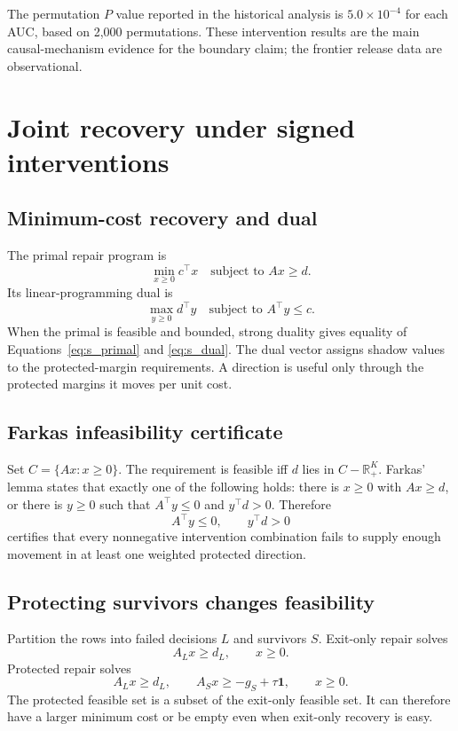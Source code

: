 \documentclass[11pt,letterpaper]{article}
\theoremstyle{plain}
\newcommand{\R}{\mathbb R}
\newcommand{\1}{\mathbf 1}
\begin{document}
The permutation $P$ value reported in the historical analysis is $5.0\times10^{-4}$ for each AUC, based on 2,000 permutations. These intervention results are the main causal-mechanism evidence for the boundary claim; the frontier release data are observational.

\section{Joint recovery under signed interventions}
\subsection{Minimum-cost recovery and dual}
The primal repair program is
\begin{equation}
 \min_{x\ge0} c^\top x\quad\text{subject to }Ax\ge d.
\label{eq:s_primal}
\end{equation}
Its linear-programming dual is
\begin{equation}
 \max_{y\ge0} d^\top y\quad\text{subject to }A^\top y\le c.
\label{eq:s_dual}
\end{equation}
When the primal is feasible and bounded, strong duality gives equality of Equations~\ref{eq:s_primal} and \ref{eq:s_dual}. The dual vector assigns shadow values to the protected-margin requirements. A direction is useful only through the protected margins it moves per unit cost.

\subsection{Farkas infeasibility certificate}
Set $C=\{Ax:x\ge0\}$. The requirement is feasible iff $d$ lies in $C-\R_+^K$. Farkas' lemma states that exactly one of the following holds: there is $x\ge0$ with $Ax\ge d$, or there is $y\ge0$ such that $A^\top y\le0$ and $y^\top d>0$. Therefore
\begin{equation}
 A^\top y\le0,\qquad y^\top d>0
\label{eq:s_farkas}
\end{equation}
certifies that every nonnegative intervention combination fails to supply enough movement in at least one weighted protected direction.

\subsection{Protecting survivors changes feasibility}
Partition the rows into failed decisions $L$ and survivors $S$. Exit-only repair solves
\begin{equation}
 A_Lx\ge d_L,\qquad x\ge0.
\label{eq:s_exitonly}
\end{equation}
Protected repair solves
\begin{equation}
 A_Lx\ge d_L,\qquad A_Sx\ge -g_S+\tau\1,\qquad x\ge0.
\label{eq:s_protected}
\end{equation}
The protected feasible set is a subset of the exit-only feasible set. It can therefore have a larger minimum cost or be empty even when exit-only recovery is easy.
\end{document}
